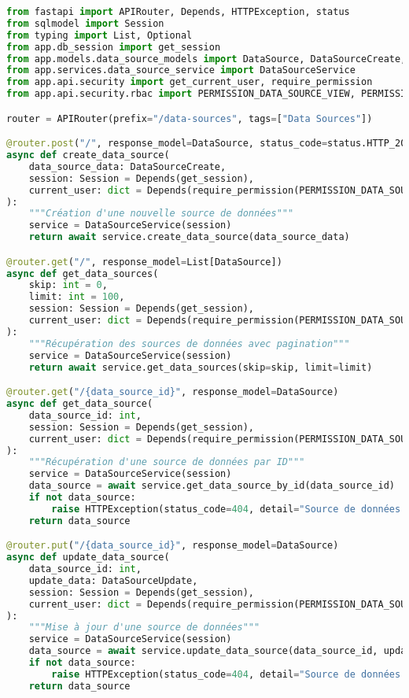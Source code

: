 \begin{lstlisting}[language=Python, caption=Routes API Data Sources]
from fastapi import APIRouter, Depends, HTTPException, status
from sqlmodel import Session
from typing import List, Optional
from app.db_session import get_session
from app.models.data_source_models import DataSource, DataSourceCreate, DataSourceUpdate
from app.services.data_source_service import DataSourceService
from app.api.security import get_current_user, require_permission
from app.api.security.rbac import PERMISSION_DATA_SOURCE_VIEW, PERMISSION_DATA_SOURCE_EDIT

router = APIRouter(prefix="/data-sources", tags=["Data Sources"])

@router.post("/", response_model=DataSource, status_code=status.HTTP_201_CREATED)
async def create_data_source(
    data_source_data: DataSourceCreate,
    session: Session = Depends(get_session),
    current_user: dict = Depends(require_permission(PERMISSION_DATA_SOURCE_EDIT))
):
    """Création d'une nouvelle source de données"""
    service = DataSourceService(session)
    return await service.create_data_source(data_source_data)

@router.get("/", response_model=List[DataSource])
async def get_data_sources(
    skip: int = 0,
    limit: int = 100,
    session: Session = Depends(get_session),
    current_user: dict = Depends(require_permission(PERMISSION_DATA_SOURCE_VIEW))
):
    """Récupération des sources de données avec pagination"""
    service = DataSourceService(session)
    return await service.get_data_sources(skip=skip, limit=limit)

@router.get("/{data_source_id}", response_model=DataSource)
async def get_data_source(
    data_source_id: int,
    session: Session = Depends(get_session),
    current_user: dict = Depends(require_permission(PERMISSION_DATA_SOURCE_VIEW))
):
    """Récupération d'une source de données par ID"""
    service = DataSourceService(session)
    data_source = await service.get_data_source_by_id(data_source_id)
    if not data_source:
        raise HTTPException(status_code=404, detail="Source de données non trouvée")
    return data_source

@router.put("/{data_source_id}", response_model=DataSource)
async def update_data_source(
    data_source_id: int,
    update_data: DataSourceUpdate,
    session: Session = Depends(get_session),
    current_user: dict = Depends(require_permission(PERMISSION_DATA_SOURCE_EDIT))
):
    """Mise à jour d'une source de données"""
    service = DataSourceService(session)
    data_source = await service.update_data_source(data_source_id, update_data)
    if not data_source:
        raise HTTPException(status_code=404, detail="Source de données non trouvée")
    return data_source


\end{lstlisting}
